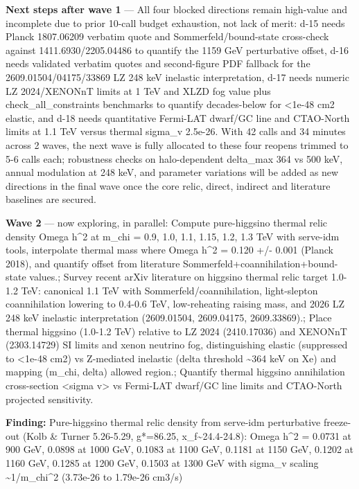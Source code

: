 \documentclass[11pt,a4paper]{article}
\begin{document}
\textbf{Next steps after wave 1} --- All four blocked directions remain high-value and incomplete due to prior 10-call budget exhaustion, not lack of merit: d-15 needs Planck 1807.06209 verbatim quote and Sommerfeld/bound-state cross-check against 1411.6930/2205.04486 to quantify the 1159 GeV perturbative offset, d-16 needs validated verbatim quotes and second-figure PDF fallback for the 2609.01504/04175/33869 LZ 248 keV inelastic interpretation, d-17 needs numeric LZ 2024/XENONnT limits at 1 TeV and XLZD fog value plus check\_all\_constraints benchmarks to quantify decades-below for \textless{}1e-48 cm2 elastic, and d-18 needs quantitative Fermi-LAT dwarf/GC line and CTAO-North limits at 1.1 TeV versus thermal sigma\_v 2.5e-26. With 42 calls and 34 minutes across 2 waves, the next wave is fully allocated to these four reopens trimmed to 5-6 calls each; robustness checks on halo-dependent delta\_max 364 vs 500 keV, annual modulation at 248 keV, and parameter variations will be added as new directions in the final wave once the core relic, direct, indirect and literature baselines are secured.

\textbf{Wave 2} --- now exploring, in parallel: Compute pure-higgsino thermal relic density Omega h\textasciicircum{}2 at m\_chi = 0.9, 1.0, 1.1, 1.15, 1.2, 1.3 TeV with serve-idm tools, interpolate thermal mass where Omega h\textasciicircum{}2 = 0.120 +/- 0.001 (Planck 2018), and quantify offset from literature Sommerfeld+coannihilation+bound-state values.; Survey recent arXiv literature on higgsino thermal relic target 1.0-1.2 TeV: canonical 1.1 TeV with Sommerfeld/coannihilation, light-slepton coannihilation lowering to 0.4-0.6 TeV, low-reheating raising mass, and 2026 LZ 248 keV inelastic interpretation (2609.01504, 2609.04175, 2609.33869).; Place thermal higgsino (1.0-1.2 TeV) relative to LZ 2024 (2410.17036) and XENONnT (2303.14729) SI limits and xenon neutrino fog, distinguishing elastic (suppressed to \textless{}1e-48 cm2) vs Z-mediated inelastic (delta threshold \textasciitilde{}364 keV on Xe) and mapping (m\_chi, delta) allowed region.; Quantify thermal higgsino annihilation cross-section \textless{}sigma v\textgreater{} vs Fermi-LAT dwarf/GC line limits and CTAO-North projected sensitivity.

\textbf{Finding:} Pure-higgsino thermal relic density from serve-idm perturbative freeze-out (Kolb \& Turner 5.26-5.29, g*=86.25, x\_f\textasciitilde{}24.4-24.8): Omega h\textasciicircum{}2 = 0.0731 at 900 GeV, 0.0898 at 1000 GeV, 0.1083 at 1100 GeV, 0.1181 at 1150 GeV, 0.1202 at 1160 GeV, 0.1285 at 1200 GeV, 0.1503 at 1300 GeV with sigma\_v scaling \textasciitilde{}1/m\_chi\textasciicircum{}2 (3.73e-26 to 1.79e-26 cm3/s)
\end{document}
